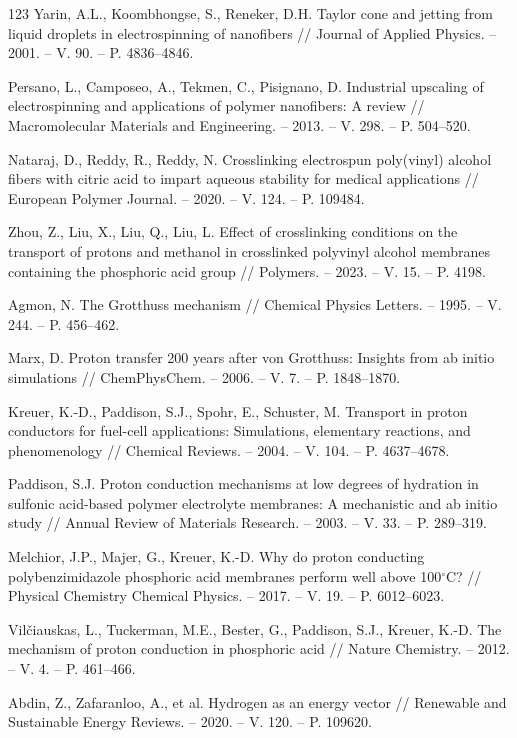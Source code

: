 \documentclass[12pt,a4paper]{report}
\begin{document}
\begin{thebibliography}{123}
 Yarin, A.L., Koombhongse, S., Reneker, D.H. Taylor cone and jetting from liquid droplets in electrospinning of nanofibers // Journal of Applied Physics. – 2001. – V. 90. – P. 4836–4846.

 Persano, L., Camposeo, A., Tekmen, C., Pisignano, D. Industrial upscaling of electrospinning and applications of polymer nanofibers: A review // Macromolecular Materials and Engineering. – 2013. – V. 298. – P. 504–520.

 Nataraj, D., Reddy, R., Reddy, N. Crosslinking electrospun poly(vinyl) alcohol fibers with citric acid to impart aqueous stability for medical applications // European Polymer Journal. – 2020. – V. 124. – P. 109484.

 Zhou, Z., Liu, X., Liu, Q., Liu, L. Effect of crosslinking conditions on the transport of protons and methanol in crosslinked polyvinyl alcohol membranes containing the phosphoric acid group // Polymers. – 2023. – V. 15. – P. 4198.

 Agmon, N. The Grotthuss mechanism // Chemical Physics Letters. – 1995. – V. 244. – P. 456–462.

 Marx, D. Proton transfer 200 years after von Grotthuss: Insights from ab initio simulations // ChemPhysChem. – 2006. – V. 7. – P. 1848–1870.

 Kreuer, K.-D., Paddison, S.J., Spohr, E., Schuster, M. Transport in proton conductors for fuel-cell applications: Simulations, elementary reactions, and phenomenology // Chemical Reviews. – 2004. – V. 104. – P. 4637–4678.

 Paddison, S.J. Proton conduction mechanisms at low degrees of hydration in sulfonic acid-based polymer electrolyte membranes: A mechanistic and ab initio study // Annual Review of Materials Research. – 2003. – V. 33. – P. 289–319.

 Melchior, J.P., Majer, G., Kreuer, K.-D. Why do proton conducting polybenzimidazole phosphoric acid membranes perform well above 100\(^\circ\)C? // Physical Chemistry Chemical Physics. – 2017. – V. 19. – P. 6012–6023.

 Vilčiauskas, L., Tuckerman, M.E., Bester, G., Paddison, S.J., Kreuer, K.-D. The mechanism of proton conduction in phosphoric acid // Nature Chemistry. – 2012. – V. 4. – P. 461–466.

 Abdin, Z., Zafaranloo, A., et al. Hydrogen as an energy vector // Renewable and Sustainable Energy Reviews. – 2020. – V. 120. – P. 109620.


\end{thebibliography}
\end{document}
